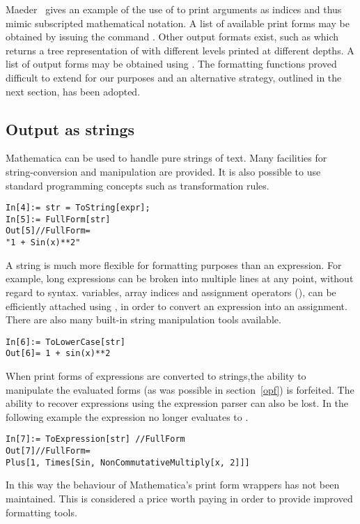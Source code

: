 \documentclass [12pt,twoside]{article}
\begin{document}
Maeder~\cite{maederbook} gives an example of the use of  to
print arguments as indices and thus mimic subscripted mathematical
notation. A list of available print forms may be obtained by issuing the
command . Other output formats exist, such as
 which returns a tree representation of  with
different levels printed at different depths. A list of output forms may be
obtained using . The formatting functions proved
difficult to extend for our purposes and an alternative strategy, outlined in the
next section, has been adopted.

\pagebreak[2]

\subsection{Output as strings}
Mathematica can be used to handle pure strings of text. Many facilities for
string-conversion and manipulation are provided. It is also possible to
use standard programming concepts such as transformation rules.
\begin{verbatim}
In[4]:= str = ToString[expr];
In[5]:= FullForm[str]
Out[5]//FullForm=
"1 + Sin(x)**2"
\end{verbatim}
A string is much more flexible for formatting purposes than an expression. For
example, long expressions can be broken into multiple lines at any point, without
regard to syntax.  variables, array indices and assignment operators
(\mma{\quotes $=$\quotes}), can be efficiently attached using ,
in order to convert an expression into an assignment. There are also many
built-in string manipulation tools available.
\begin{verbatim}
In[6]:= ToLowerCase[str]
Out[6]= 1 + sin(x)**2
\end{verbatim}
When print forms of expressions are converted to strings,the ability to manipulate
the evaluated forms (as was possible in section~\ref{opf}) is forfeited. The
ability to recover expressions using the expression parser  can
also be lost. In the following example the expression no longer evaluates to
.
\begin{verbatim}
In[7]:= ToExpression[str] //FullForm
Out[7]//FullForm=
Plus[1, Times[Sin, NonCommutativeMultiply[x, 2]]]
\end{verbatim}
In this way the behaviour of Mathematica's print form wrappers has not been
maintained. This is considered a price worth paying in order to provide
improved formatting tools.
\end{document}
